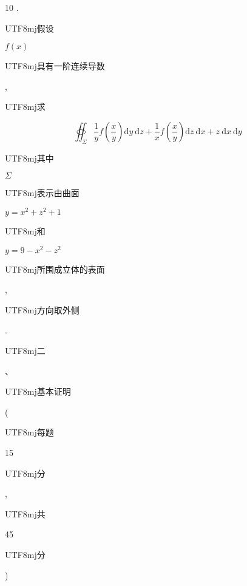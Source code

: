 \documentclass[10pt]{article}
\begin{document}
10 . \begin{CJK}{UTF8}{mj}假设\end{CJK} $f(x)$ \begin{CJK}{UTF8}{mj}具有一阶连续导数\end{CJK}, \begin{CJK}{UTF8}{mj}求\end{CJK}
$$
\oiint_{\Sigma} \frac{1}{y} f\left(\frac{x}{y}\right) \mathrm{d} y \mathrm{~d} z+\frac{1}{x} f\left(\frac{x}{y}\right) \mathrm{d} z \mathrm{~d} x+z \mathrm{~d} x \mathrm{~d} y
$$
\begin{CJK}{UTF8}{mj}其中\end{CJK} $\Sigma$ \begin{CJK}{UTF8}{mj}表示由曲面\end{CJK} $y=x^{2}+z^{2}+1$ \begin{CJK}{UTF8}{mj}和\end{CJK} $y=9-x^{2}-z^{2}$ \begin{CJK}{UTF8}{mj}所围成立体的表面\end{CJK}, \begin{CJK}{UTF8}{mj}方向取外侧\end{CJK}. \begin{CJK}{UTF8}{mj}二\end{CJK}、\begin{CJK}{UTF8}{mj}基本证明\end{CJK}(\begin{CJK}{UTF8}{mj}每题\end{CJK} 15 \begin{CJK}{UTF8}{mj}分\end{CJK}, \begin{CJK}{UTF8}{mj}共\end{CJK} 45 \begin{CJK}{UTF8}{mj}分\end{CJK})
\end{document}
